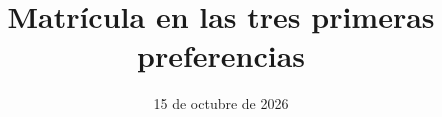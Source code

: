 \documentclass[aspectratio=169]{beamer}
\usepackage{slides}


\title{Matrícula en las tres primeras preferencias}
\date{15 de octubre de 2026}



\begin{frame}
  \titlepage
\end{frame}

\section{Población}

\begin{frame}{¿De qué depende que un postulante se matricule en una de sus tres primeras preferencias?}
  \vfill
  \begin{center}
    {\Huge 55,7\,\%}\\[6pt]
    {\large de los 108.251 postulantes de la promoción 2025 lo logró}
  \end{center}
\end{frame}

